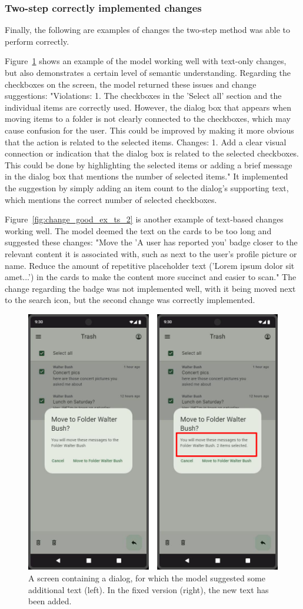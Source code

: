 \documentclass[11pt,titlepage,oneside,openany]{book}
\begin{document}
\subsubsection{Two-step correctly implemented changes}

Finally, the following are examples of changes the two-step method was able to perform correctly.

Figure~\ref{fig:change_good_ex_ts_1} shows an example of the model working well with text-only changes, but also demonstrates a certain level of semantic understanding. Regarding the checkboxes on the screen, the model returned these issues and change suggestions: "Violations: 1. The checkboxes in the 'Select all' section and the individual items are correctly used. However, the dialog box that appears when moving items to a folder is not clearly connected to the checkboxes, which may cause confusion for the user. This could be improved by making it more obvious that the action is related to the selected items. Changes: 1. Add a clear visual connection or indication that the dialog box is related to the selected checkboxes. This could be done by highlighting the selected items or adding a brief message in the dialog box that mentions the number of selected items." It implemented the suggestion by simply adding an item count to the dialog's supporting text, which mentions the correct number of selected checkboxes.

Figure~\ref{fig:change_good_ex_ts_2} is another example of text-based changes working well. The model deemed the text on the cards to be too long and suggested these changes: "Move the 'A user has reported you' badge closer to the relevant content it is associated with, such as next to the user's profile picture or name. Reduce the amount of repetitive placeholder text ('Lorem ipsum dolor sit amet...') in the cards to make the content more succinct and easier to scan." The change regarding the badge was not implemented well, with it being moved next to the search icon, but the second change was correctly implemented. 

\begin{figure}[H]
	\centering
	\includegraphics[width=.56\textwidth]{figures/change_good_ex_ts_1.jpg}
	\caption{A screen containing a dialog, for which the model suggested some additional text (left). In the fixed version (right), the new text has been added.}
	\label{fig:change_good_ex_ts_1}
\end{figure}
\end{document}
